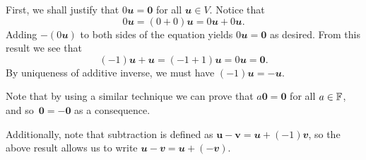 \documentclass[math, code]{amznotes}
\theoremstyle{remark}
\newcommand{\zero}{\mathbf{0}}
\begin{document}
First, we shall justify that $0\mathbfit{u} = \zero$ for all $\mathbfit{u} \in V$. Notice that
\begin{equation*}
    0\mathbfit{u} = (0 + 0)\mathbfit{u} = 0\mathbfit{u} + 0\mathbfit{u}.
\end{equation*}
Adding $-(0\mathbfit{u})$ to both sides of the equation yields $0\mathbfit{u} = \zero$ as desired. From this result we see that
\begin{equation*}
    (-1)\mathbfit{u} + \mathbfit{u} = (-1 + 1)\mathbfit{u} = 0\mathbfit{u} = \zero.
\end{equation*}
By uniqueness of additive inverse, we must have $(-1)\mathbfit{u} = -\mathbfit{u}$.

Note that by using a similar technique we can prove that $a\zero = \zero$ for all $a \in \mathbb{F}$, and so~$\zero = -\zero$ as a consequence.

Additionally, note that subtraction is defined as $\mathbf{u - v} = \mathbfit{u} + (-1)\mathbfit{v}$, so the above result allows us to write $\mathbfit{u - v} = \mathbfit{u} + (-\mathbfit{v})$.
\end{document}
